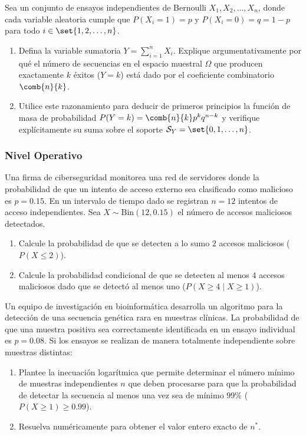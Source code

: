 \begin{problema}
	\label{prob:3.4.3}
	Sea un conjunto de ensayos independientes de Bernoulli $X_1, X_2, \dots, X_n$, donde cada variable aleatoria cumple que $P(X_i = 1) = p$ y $P(X_i = 0) = q = 1-p$ para todo $i \in \set{1, 2, \dots, n}$.
	\begin{enumerate}
		\item Defina la variable sumatoria $Y = \sum_{i=1}^n X_i$. Explique argumentativamente por qué el número de secuencias en el espacio muestral $\Omega$ que producen exactamente $k$ éxitos ($Y = k$) está dado por el coeficiente combinatorio $\comb{n}{k}$.
		\item Utilice este razonamiento para deducir de primeros principios la función de masa de probabilidad $P(Y = k) = \comb{n}{k} p^k q^{n-k}$ y verifique explícitamente su suma sobre el soporte $\mathcal{S}_Y = \set{0, 1, \dots, n}$.
	\end{enumerate}
\end{problema}

\subsubsection*{Nivel Operativo}

\begin{problema}
	\label{prob:3.4.4}
	Una firma de ciberseguridad monitorea una red de servidores donde la probabilidad de que un intento de acceso externo sea clasificado como malicioso es $p = 0.15$. En un intervalo de tiempo dado se registran $n = 12$ intentos de acceso independientes. Sea $X \sim \text{Bin}(12, 0.15)$ el número de accesos maliciosos detectados.
	\begin{enumerate}
		\item Calcule la probabilidad de que se detecten a lo sumo $2$ accesos maliciosos ($P(X \le 2)$).
		\item Calcule la probabilidad condicional de que se detecten al menos $4$ accesos maliciosos dado que se detectó al menos uno ($P(X \ge 4 \mid X \ge 1)$).
	\end{enumerate}
\end{problema}

\begin{problema}
	\label{prob:3.4.5}
	Un equipo de investigación en bioinformática desarrolla un algoritmo para la detección de una secuencia genética rara en muestras clínicas. La probabilidad de que una muestra positiva sea correctamente identificada en un ensayo individual es $p = 0.08$. Si los ensayos se realizan de manera totalmente independiente sobre muestras distintas:
	\begin{enumerate}
		\item Plantee la inecuación logarítmica que permite determinar el número mínimo de muestras independientes $n$ que deben procesarse para que la probabilidad de detectar la secuencia al menos una vez sea de mínimo $99\%$ ($P(X \ge 1) \ge 0.99$).
		\item Resuelva numéricamente para obtener el valor entero exacto de $n^*$.
	\end{enumerate}
\end{problema}

